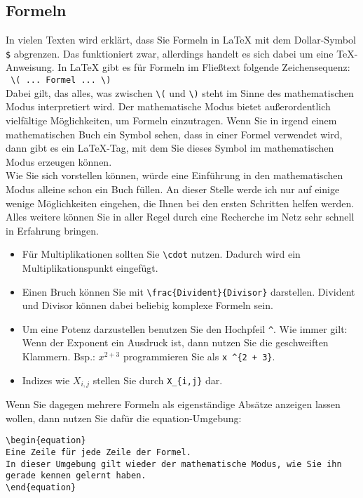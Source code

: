 \subsection{Formeln}

In vielen Texten wird erklärt, dass Sie Formeln in LaTeX mit dem Dollar-Symbol \verb|$| abgrenzen. Das funktioniert zwar, allerdings handelt es sich dabei um eine TeX-Anweisung. In LaTeX gibt es für Formeln im Fließtext folgende Zeichensequenz:\\

\verb| \( ... Formel ... \)|\\

Dabei gilt, das alles, was zwischen \verb|\(| und \verb|\)| steht im Sinne des mathematischen Modus interpretiert wird. Der mathematische Modus bietet außerordentlich vielfältige Möglichkeiten, um Formeln einzutragen. Wenn Sie in irgend einem mathematischen Buch ein Symbol sehen, dass in einer Formel verwendet wird, dann gibt es ein LaTeX-Tag, mit dem Sie dieses Symbol im mathematischen Modus erzeugen können.\\

Wie Sie sich vorstellen können, würde eine Einführung in den mathematischen Modus alleine schon ein Buch füllen. An dieser Stelle werde ich nur auf einige wenige Möglichkeiten eingehen, die Ihnen bei den ersten Schritten helfen werden. Alles weitere können Sie in aller Regel durch eine Recherche im Netz sehr schnell in Erfahrung bringen.

\begin{itemize}
	\item Für Multiplikationen sollten Sie \verb|\cdot| nutzen. Dadurch wird ein Multiplikationspunkt eingefügt.
	\item Einen Bruch können Sie mit \verb|\frac{Divident}{Divisor}| darstellen. Divident und Divisor können dabei beliebig komplexe Formeln sein.
	\item Um eine Potenz darzustellen benutzen Sie den Hochpfeil \verb|^|. Wie immer gilt: Wenn der Exponent ein Ausdruck ist, dann nutzen Sie die geschweiften Klammern. Bsp.: \(x^{2 + 3}\) programmieren Sie als \verb|x ^{2 + 3}|.
	\item Indizes wie \(X_{i,j}\) stellen Sie durch \verb|X_{i,j}| dar.
\end{itemize}

Wenn Sie dagegen mehrere Formeln als eigenständige Absätze anzeigen lassen wollen, dann nutzen Sie dafür die equation-Umgebung:

\begin{verbatim}
\begin{equation}
Eine Zeile für jede Zeile der Formel.
In dieser Umgebung gilt wieder der mathematische Modus, wie Sie ihn gerade kennen gelernt haben.
\end{equation}
\end{verbatim}

